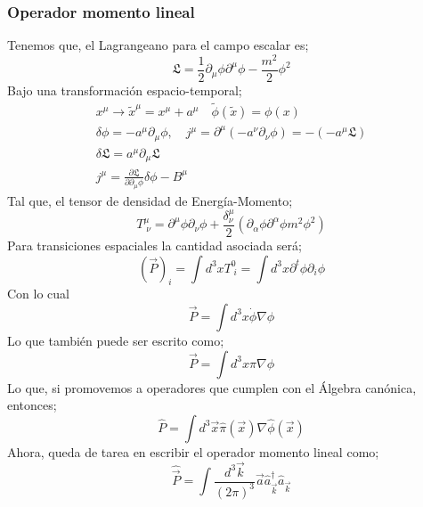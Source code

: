 \documentclass[../main.tex]{subfiles}
\begin{document}
 \subsubsection{Operador momento lineal}
 Tenemos que, el Lagrangeano para el campo escalar es;
 \begin{equation}
   \mathfrak{L} = \frac{1}{2} \partial_\mu \phi \partial^\mu \phi - \frac{m^2}{2} \phi^2
  \end{equation}
  Bajo una transformación espacio-temporal;
  \begin{align*}
    x^\mu \rightarrow \tilde{x}^\mu = x^\mu + a^\mu \quad \tilde{\phi}(\tilde{x}) = \phi(x) \\
    \delta \phi = -a^\mu \partial_\mu \phi,\quad j^\mu = \partial^\mu \left( -a^\nu \partial_\nu \phi \right) = -(-a^\mu \mathfrak{L})\\
    \delta \mathfrak{L} = a^\mu \partial_\mu \mathfrak{L} \\
    j^\mu = \frac{\partial \mathfrak{L}}{\partial \partial_\mu \phi} \delta \phi - B^\mu
  \end{align*}
  Tal que, el tensor de densidad de Energía-Momento;
  \begin{equation}
     T^\mu_{\;\nu} = \partial^\mu\phi \partial_\nu \phi + \frac{\delta^\mu_\nu}{2} \left( \partial_\alpha \phi \partial^\alpha \phi  m^2 \phi^2 \right)
   \end{equation}
   Para transiciones espaciales la cantidad asociada será;
   \begin{equation*}
     (\vec{P})_i = \int d^3x T^0_{\;i} = \int d^3x \partial^t \phi \partial_i\phi
    \end{equation*}
    Con lo cual
    \begin{equation}
      \vec{P} = \int d^3x \dot{\phi}\nabla \phi
     \end{equation}
     Lo que también puede ser escrito como;
     \begin{equation}
       \vec{P} = \int d^3x \pi \nabla \phi
      \end{equation}
      Lo que, si promovemos a operadores que cumplen con el Álgebra canónica, entonces;
      \begin{equation}
        \hat{P} = \int d^3\vec{x} \hat{\pi}(\vec{x})\nabla \hat{\phi}(\vec{x})
       \end{equation}
Ahora, queda de tarea en escribir el operador momento lineal como;
\begin{equation}
  \hat{\vec{P}} = \int \frac{d^3\vec{k}}{(2\pi)^3} \vec{a} \hat{a}^\dagger_{\vec{k}}\hat{a}_{\vec{k}}
 \end{equation}
\end{document}
